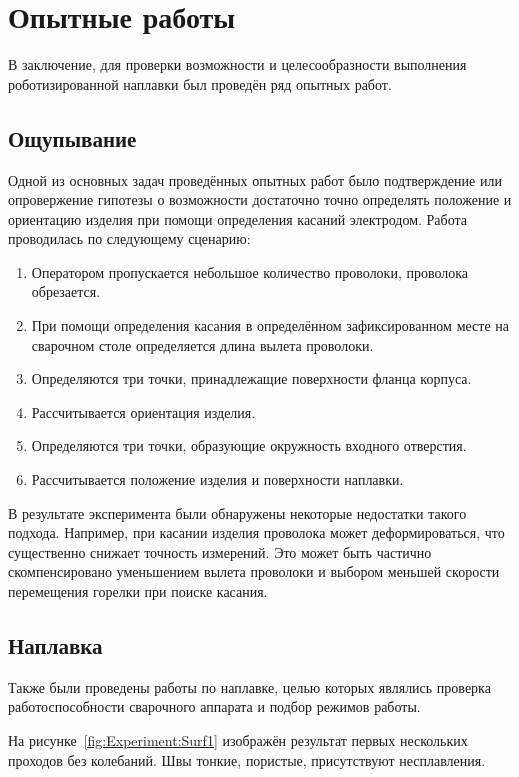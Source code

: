 \chapter{Опытные работы}
В заключение, для проверки возможности и целесообразности выполнения роботизированной наплавки был проведён ряд опытных работ.


\section{Ощупывание}
Одной из основных задач проведённых опытных работ было подтверждение или опровержение гипотезы о возможности достаточно точно определять положение и ориентацию изделия при помощи определения касаний электродом.
Работа проводилась по следующему сценарию:

\begin{enumerate}
    \item Оператором пропускается небольшое количество проволоки, проволока обрезается.
    \item При помощи определения касания в определённом зафиксированном месте на сварочном столе определяется длина вылета проволоки.
    \item Определяются три точки, принадлежащие поверхности фланца корпуса.
    \item Рассчитывается ориентация изделия.
    \item Определяются три точки, образующие окружность входного отверстия.
    \item Рассчитывается положение изделия и поверхности наплавки.
\end{enumerate}

В результате эксперимента были обнаружены некоторые недостатки такого подхода.
Например, при касании изделия проволока может деформироваться, что существенно снижает точность измерений.
Это может быть частично скомпенсировано уменьшением вылета проволоки и выбором меньшей скорости перемещения горелки при поиске касания.


\section{Наплавка}
Также были проведены работы по наплавке, целью которых являлись проверка работоспособности сварочного аппарата и подбор режимов работы.

На рисунке~\ref{fig:Experiment:Surf1} изображён результат первых нескольких проходов без колебаний.
Швы тонкие, пористые, присутствуют несплавления.

